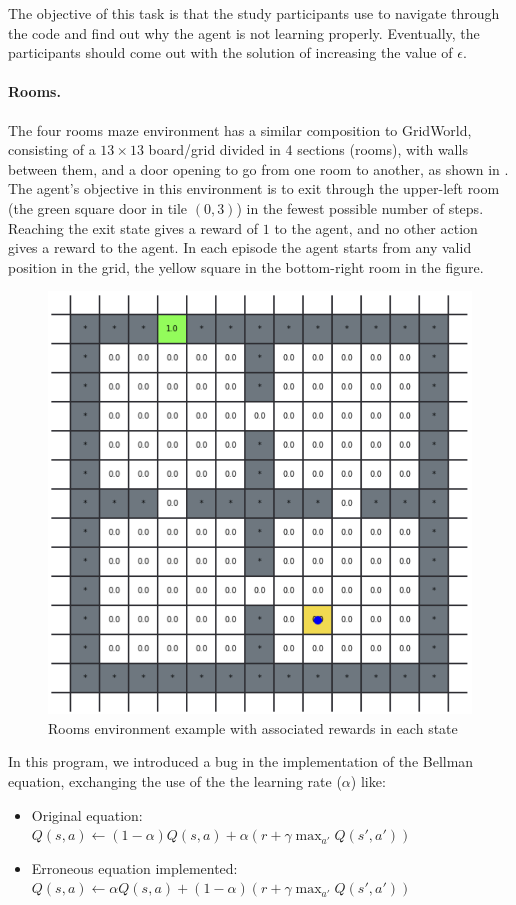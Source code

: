 The objective of this task is that the study participants use \flik to navigate through the code and find 
out why the agent is not learning properly. Eventually, the participants should come out with the 
solution of increasing the value of $\epsilon$. 

\paragraph{\textbf{Rooms.}} 
The four rooms maze environment has a similar composition to GridWorld, consisting of a 
$13\times 13$ board/grid divided in $4$ sections (\ie rooms), with walls between them, and a door 
opening to go from one room to another, as shown in . The agent's objective in this 
environment is to exit through the upper-left room (the green square door in tile $(0,3)$) in the fewest 
possible number of steps. Reaching the exit state gives a reward of $1$ to the agent, and no 
other action gives a reward to the agent. In each episode the agent starts from any valid position in the 
grid, \eg the yellow square in the bottom-right room in the figure. 

\begin{figure}[hptb]
  \centering
  \includegraphics[width=0.5\columnwidth]{figures/rooms.png}
  \caption{Rooms environment example with associated rewards in each state}
  \label{fig:rooms}
\end{figure}

In this program, we introduced a bug in the implementation of the Bellman equation, exchanging the  
use of the the learning rate ($\alpha$) like:

\begin{itemize}
\item Original equation:
$
Q(s, a) \leftarrow (1-\alpha) Q(s, a) + \alpha \left( r + \gamma \max_{a'} Q(s', a') \right)
$

\item Erroneous equation implemented:
$
Q(s, a) \leftarrow  \alpha Q(s, a) + (1-\alpha) \left( r + \gamma \max_{a'} Q(s', a') \right)
$
\end{itemize}

